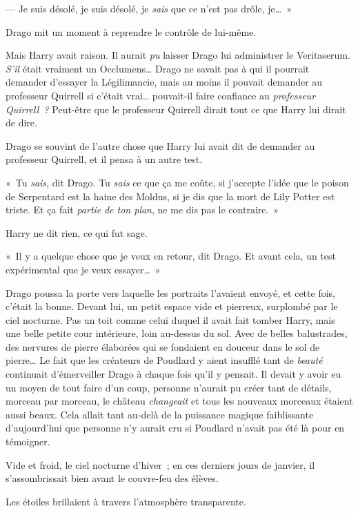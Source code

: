 --- Je suis désolé, je suis désolé, je \emph{sais} que ce n'est pas drôle, je…~»

Drago mit un moment à reprendre le contrôle de lui-même.

Mais Harry avait raison. Il aurait \emph{pu} laisser Drago lui administrer le Veritaserum. \emph{S'il} était vraiment un Occlumens… Drago ne savait pas à qui il pourrait demander d'essayer la Légilimancie, mais au moins il pouvait demander au professeur Quirrell si c'était vrai… pouvait-il faire confiance au \emph{professeur Quirrell~?} Peut-être que le professeur Quirrell dirait tout ce que Harry lui dirait de dire.

Drago se souvint de l'autre chose que Harry lui avait dit de demander au professeur Quirrell, et il pensa à un autre test.

«~Tu \emph{sais}, dit Drago. Tu \emph{sais} ce que ça me coûte, si j'accepte l'idée que le poison de Serpentard est la haine des Moldus, si je dis que la mort de Lily Potter est triste. Et ça fait \emph{partie} \emph{de ton plan}, ne me dis pas le contraire.~»

Harry ne dit rien, ce qui fut sage.

«~Il y a quelque chose que je veux en retour, dit Drago. Et avant cela, un test expérimental que je veux essayer…~»

\later

Drago poussa la porte vers laquelle les portraits l'avaient envoyé, et cette fois, c'était la bonne. Devant lui, un petit espace vide et pierreux, surplombé par le ciel nocturne. Pas un toit comme celui duquel il avait fait tomber Harry, mais une belle petite cour intérieure, loin au-dessus du sol. Avec de belles balustrades, des nervures de pierre élaborées qui se fondaient en douceur dans le sol de pierre… Le fait que les créateurs de Poudlard y aient insufflé tant de \emph{beauté} continuait d'émerveiller Drago à chaque fois qu'il y pensait. Il devait y avoir eu un moyen de tout faire d'un coup, personne n'aurait pu créer tant de détails, morceau par morceau, le château \emph{changeait} et tous les nouveaux morceaux étaient aussi beaux. Cela allait tant au-delà de la puissance magique faiblissante d'aujourd'hui que personne n'y aurait cru si Poudlard n'avait pas été là pour en témoigner.

Vide et froid, le ciel nocturne d'hiver~; en ces derniers jours de janvier, il s'assombrissait bien avant le couvre-feu des élèves.

Les étoiles brillaient à travers l'atmosphère transparente.

